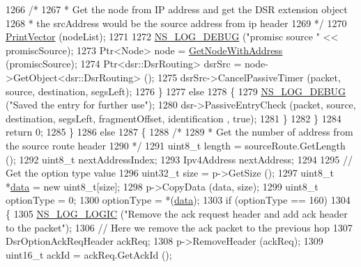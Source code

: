 \begin{DoxyCode}
1266               \textcolor{comment}{/*}
1267 \textcolor{comment}{               * Get the node from IP address and get the DSR extension object}
1268 \textcolor{comment}{               * the srcAddress would be the source address from ip header}
1269 \textcolor{comment}{               */}
1270               \hyperlink{classns3_1_1dsr_1_1DsrOptions_a44ae8e58769880ec9c0150bb28652350}{PrintVector} (nodeList);
1271 
1272               \hyperlink{group__logging_ga413f1886406d49f59a6a0a89b77b4d0a}{NS\_LOG\_DEBUG} (\textcolor{stringliteral}{"promisc source "} << promiscSource);
1273               Ptr<Node> node = \hyperlink{classns3_1_1dsr_1_1DsrOptions_a1a91f820f3d754a477a54bad547ca659}{GetNodeWithAddress} (promiscSource);
1274               Ptr<dsr::DsrRouting> dsrSrc = node->GetObject<dsr::DsrRouting> ();
1275               dsrSrc->CancelPassiveTimer (packet, source, destination, segsLeft);
1276             \}
1277           \textcolor{keywordflow}{else}
1278             \{
1279               \hyperlink{group__logging_ga413f1886406d49f59a6a0a89b77b4d0a}{NS\_LOG\_DEBUG} (\textcolor{stringliteral}{"Saved the entry for further use"});
1280               dsr->PassiveEntryCheck (packet, source, destination, segsLeft, fragmentOffset, identification
      , \textcolor{keyword}{true});
1281             \}
1282         \}
1284       \textcolor{keywordflow}{return} 0;
1285     \}
1286   \textcolor{keywordflow}{else}
1287     \{
1288       \textcolor{comment}{/*}
1289 \textcolor{comment}{       * Get the number of address from the source route header}
1290 \textcolor{comment}{       */}
1291       uint8\_t length = sourceRoute.GetLength ();
1292       uint8\_t nextAddressIndex;
1293       Ipv4Address nextAddress;
1294 
1295       \textcolor{comment}{// Get the option type value}
1296       uint32\_t size = p->GetSize ();
1297       uint8\_t *\hyperlink{topology-example-sim_8cc_a26c65296e316af77b787dc77469bb2a4}{data} = \textcolor{keyword}{new} uint8\_t[size];
1298       p->CopyData (data, size);
1299       uint8\_t optionType = 0;
1300       optionType = *(\hyperlink{topology-example-sim_8cc_a26c65296e316af77b787dc77469bb2a4}{data});
1303       \textcolor{keywordflow}{if} (optionType == 160)
1304         \{
1305           \hyperlink{group__logging_ga88acd260151caf2db9c0fc84997f45ce}{NS\_LOG\_LOGIC} (\textcolor{stringliteral}{"Remove the ack request header and add ack header to the packet"});
1306           \textcolor{comment}{// Here we remove the ack packet to the previous hop}
1307           DsrOptionAckReqHeader ackReq;
1308           p->RemoveHeader (ackReq);
1309           uint16\_t ackId = ackReq.GetAckId ();

\end{DoxyCode}
